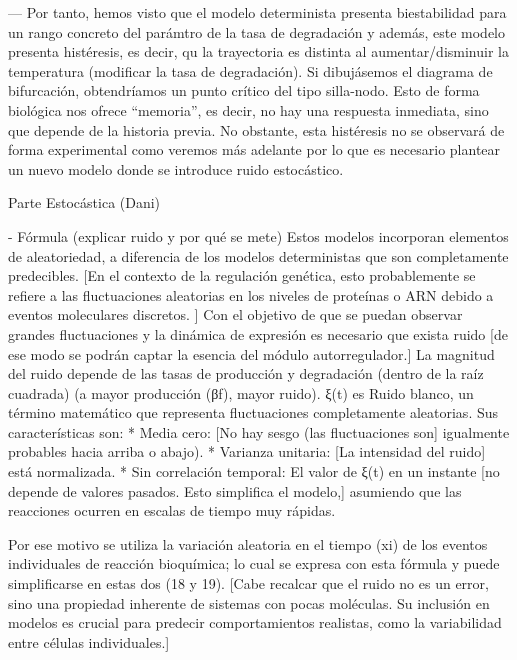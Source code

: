 ---
Por tanto, hemos visto que el modelo determinista presenta biestabilidad para un rango concreto del parámtro de la tasa de degradación y además, este modelo presenta histéresis, es decir, qu la trayectoria es distinta al aumentar/disminuir la temperatura (modificar la tasa de degradación). 
Si dibujásemos el diagrama de bifurcación, obtendríamos un punto crítico del tipo silla-nodo.
Esto de forma biológica nos ofrece “memoria”, es decir, no hay una respuesta inmediata, sino que depende de la historia previa. No obstante, esta histéresis no se observará de forma experimental como veremos más adelante por lo que es necesario plantear un nuevo modelo donde se introduce ruido estocástico.



Parte Estocástica (Dani)

- Fórmula (explicar ruido y por qué se mete)
Estos modelos incorporan elementos de aleatoriedad, a diferencia de los modelos deterministas que son completamente predecibles. [En el contexto de la regulación genética, esto probablemente se refiere a las fluctuaciones aleatorias en los niveles de proteínas o ARN debido a eventos moleculares discretos. ]
Con el objetivo de que se puedan observar grandes fluctuaciones y la dinámica de expresión es necesario que exista ruido [de ese modo se podrán captar la esencia del módulo autorregulador.]
La magnitud del ruido depende de las tasas de producción y degradación (dentro de la raíz cuadrada) (a mayor producción (βf), mayor ruido).
ξ(t) es Ruido blanco, un término matemático que representa fluctuaciones completamente aleatorias. Sus características son: 
* Media cero: [No hay sesgo (las fluctuaciones son] igualmente probables hacia arriba o abajo). 
* Varianza unitaria: [La intensidad del ruido] está normalizada. 
* Sin correlación temporal: El valor de ξ(t) en un instante [no depende de valores pasados. Esto simplifica el modelo,] asumiendo que las reacciones ocurren en escalas de tiempo muy rápidas.

Por ese motivo se utiliza la variación aleatoria en el tiempo (xi) de los eventos individuales de reacción bioquímica; lo cual se expresa con esta fórmula y puede simplificarse en estas dos (18 y 19).
[Cabe recalcar que el ruido no es un error, sino una propiedad inherente de sistemas con pocas moléculas. Su inclusión en modelos es crucial para predecir comportamientos realistas, como la variabilidad entre células individuales.]


